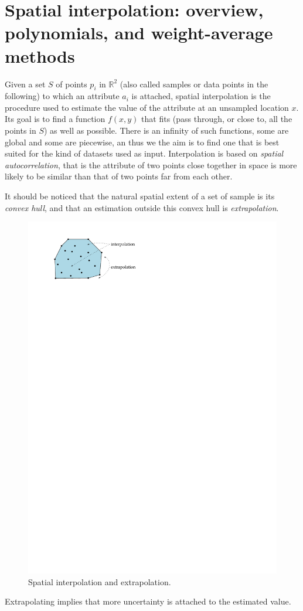 
\graphicspath{{interpol/}}

\chapter{Spatial interpolation: overview, polynomials, and weight-average methods}%
\label{chap:interpol}


Given a set $S$ of points $p_i$ in $\mathbb{R}^2$ (also called samples or data points in the following) to which an attribute $a_i$ is attached, spatial interpolation is the procedure used to estimate the value of the attribute at an unsampled location $x$. 
Its goal is to find a function $f(x,y)$ that fits (pass through, or close to, all the points in $S$) as well as possible. 
There is an infinity of such functions, some are global and some are piecewise, an thus we the aim is to find one that is best suited for the kind of datasets used as input.
Interpolation is based on \emph{spatial autocorrelation}, that is the attribute of two points close together in space is more likely to be similar than that of two points far from each other.

%

It should be noticed that the natural spatial extent of a set of sample is its \emph{convex hull}, and that an estimation outside this convex hull is \emph{extrapolation}.
\begin{figure}
  \centering
  \includegraphics[width=0.4\linewidth]{figs/extrapolation}
  \caption{Spatial interpolation and extrapolation.}
\label{fig:extrapolation}
\end{figure}
Extrapolating implies that more uncertainty is attached to the estimated value.

%

